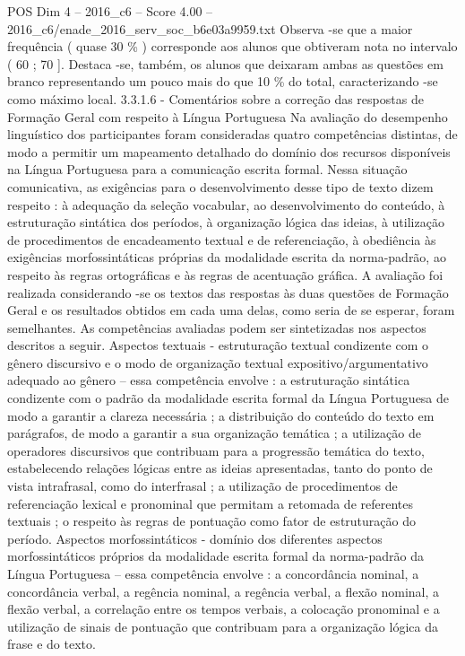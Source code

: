 \begin{textsample}{POS Dim 4 – 2016\_c6 – Score 4.00 – 2016\_c6/enade\_2016\_serv\_soc\_b6e03a9959.txt}
Observa -se que a maior frequência ( quase 30 \% ) corresponde aos alunos que obtiveram nota no intervalo ( 60 ; 70 ].
Destaca -se, também, os alunos que deixaram ambas as questões em branco representando um pouco mais do que 10 \% do total, caracterizando -se como máximo local. 3.3.1.6 - Comentários sobre a correção das respostas de Formação Geral com respeito à Língua Portuguesa Na avaliação do desempenho linguístico dos participantes foram consideradas quatro competências distintas, de modo a permitir um mapeamento detalhado do domínio dos recursos disponíveis na Língua Portuguesa para a comunicação escrita formal.
Nessa situação comunicativa, as exigências para o desenvolvimento desse tipo de texto dizem respeito : à adequação da seleção vocabular, ao desenvolvimento do conteúdo, à estruturação sintática dos períodos, à organização lógica das ideias, à utilização de procedimentos de encadeamento textual e de referenciação, à obediência às exigências morfossintáticas próprias da modalidade escrita da norma-padrão, ao respeito às regras ortográficas e às regras de acentuação gráfica.
A avaliação foi realizada considerando -se os textos das respostas às duas questões de Formação Geral e os resultados obtidos em cada uma delas, como seria de se esperar, foram semelhantes.
As competências avaliadas podem ser sintetizadas nos aspectos descritos a seguir.
Aspectos textuais - estruturação textual condizente com o gênero discursivo e o modo de organização textual expositivo/argumentativo adequado ao gênero – essa competência envolve : a estruturação sintática condizente com o padrão da modalidade escrita formal da Língua Portuguesa de modo a garantir a clareza necessária ; a distribuição do conteúdo do texto em parágrafos, de modo a garantir a sua organização temática ; a utilização de operadores discursivos que contribuam para a progressão temática do texto, estabelecendo relações lógicas entre as ideias apresentadas, tanto do ponto de vista intrafrasal, como do interfrasal ; a utilização de procedimentos de referenciação lexical e pronominal que permitam a retomada de referentes textuais ; o respeito às regras de pontuação como fator de estruturação do período.
Aspectos morfossintáticos - domínio dos diferentes aspectos morfossintáticos próprios da modalidade escrita formal da norma-padrão da Língua Portuguesa – essa competência envolve : a concordância nominal, a concordância verbal, a regência nominal, a regência verbal, a flexão nominal, a flexão verbal, a correlação entre os tempos verbais, a colocação pronominal e a utilização de sinais de pontuação que contribuam para a organização lógica da frase e do texto.

\end{textsample}
